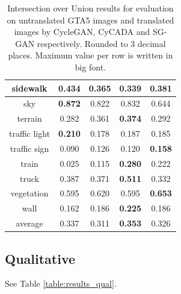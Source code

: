 \begin{table}
\begin{tabular}{|c|c|c|c|c|}
		\hline 
		sidewalk & \textbf{0.434} & 0.365 & 0.339 & 0.381\\ 
		\hline 
		sky & \textbf{0.872} & 0.822 & 0.832 & 0.644\\ 
		\hline 
		terrain & 0.282 & 0.361 & \textbf{0.374} & 0.292\\ 
		\hline 
		traffic light & \textbf{0.210} & 0.178 & 0.187 & 0.185\\ 
		\hline 
		traffic sign & 0.090 & 0.126 & 0.120 & \textbf{0.158}\\ 
		\hline 
		train & 0.025 & 0.115 & \textbf{0.280} & 0.222\\ 
		\hline 
		truck & 0.387 & 0.371 & \textbf{0.511} & 0.332\\ 
		\hline 
		vegetation & 0.595 & 0.620 & 0.595 & \textbf{0.653}\\ 
		\hline 
		wall & 0.162 & 0.186 & \textbf{0.225} & 0.186\\ 
		\hline \hline 
		average & 0.337 & 0.311 & \textbf{0.353} & 0.326\\
		\hline
	\end{tabular} 
	\caption{Intersection over Union results for evaluation on untranslated GTA5 images and translated images by CycleGAN, CyCADA and SG-GAN respectively. Rounded to 3 decimal places. Maximum value per row is written in big font.}
	\label{table:results_quant}
\end{table}

\subsection{Qualitative}
See Table \ref{table:results_qual}. 






